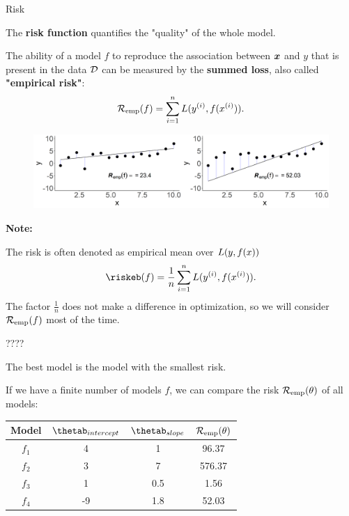 \documentclass[11pt,compress,t,notes=noshow, xcolor=table]{beamer}
\begin{document}
\begin{vbframe}{Risk}

The \textbf{risk function} quantifies the "quality" of the whole model. 

\lz

The ability of a model $f$ to reproduce the association between $\bm{x}$ and $y$ that is present in the data $\mathcal{D}$ can be measured by the \textbf{summed loss}, also called \textbf{"empirical risk"}: \\

  $$
  \mathcal{R}_{\text{emp}}(f) = \sum_{i=1}^n L(y^{(i)}, f(x^{(i)})).
  $$  
        

\vfill

\begin{center}
\begin{figure}[!b]
\includegraphics[width=1\textwidth]{figure/ml-basic_riskmin-2-risk.png}
\end{figure}
\end{center}
   
\vspace*{0.1cm}   
   
\textbf{Note:}

The risk is often denoted as empirical mean over $L(y, f(x))$
  $$
    \riskeb(f) = \frac{1}{n}\sumin \Lxyi. 
  $$
  The factor $\frac{1}{n}$ does not make a difference in optimization, so we will consider $\mathcal{R}_{\text{emp}}(f)$ most of the time.   
   
   
\end{vbframe}




\begin{vbframe}{???? }

The best model is the model with the smallest risk. 

\lz

If we have a finite number of models $f$, we can compare the risk $\mathcal{R}_{\text{emp}}(\theta)$ of all models: 


\begin{center}
\begin{tabular}{ c | c | c || c }
 Model & \(\displaystyle \thetab_{intercept} \) & \(\displaystyle \thetab_{slope} \) & \(\displaystyle \mathcal{R}_{\text{emp}}(\theta) \) \\ 
 \hline
\(\displaystyle f_1 \)  &    4   & 1 & 96.37 \\
\(\displaystyle f_2 \)   &    3 &   7 & 576.37\\
\rowcolor{lightgray}
\(\displaystyle f_3 \)   &    1  &   0.5 & 1.56\\
\(\displaystyle f_4 \)   &    -9 &   1.8 & 52.03\\
\end{tabular}
\end{center}


\end{vbframe}
\end{document}
